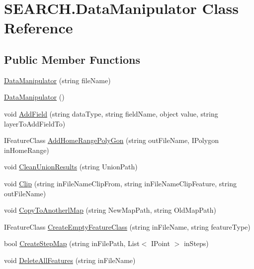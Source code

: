 \hypertarget{class_s_e_a_r_c_h_1_1_data_manipulator}{\section{S\-E\-A\-R\-C\-H.\-Data\-Manipulator Class Reference}
\label{class_s_e_a_r_c_h_1_1_data_manipulator}
}
\subsection*{Public Member Functions}
\begin{DoxyCompactItemize}
\item 
\hyperlink{class_s_e_a_r_c_h_1_1_data_manipulator_ad272a7582d505115ef08116dee408b06}{Data\-Manipulator} (string file\-Name)
\item 
\hyperlink{class_s_e_a_r_c_h_1_1_data_manipulator_acc2804681760f312bb35d3fc3b1364d7}{Data\-Manipulator} ()
\item 
void \hyperlink{class_s_e_a_r_c_h_1_1_data_manipulator_a42ccdfd6112fd36dcca324bb6981b179}{Add\-Field} (string data\-Type, string field\-Name, object value, string layer\-To\-Add\-Field\-To)
\item 
I\-Feature\-Class \hyperlink{class_s_e_a_r_c_h_1_1_data_manipulator_a1a611050f8b2b27543719ec80084ee3b}{Add\-Home\-Range\-Poly\-Gon} (string out\-File\-Name, I\-Polygon in\-Home\-Range)
\item 
void \hyperlink{class_s_e_a_r_c_h_1_1_data_manipulator_a9b3344a155bb79f1961d9c9ef8a88173}{Clean\-Union\-Results} (string Union\-Path)
\item 
void \hyperlink{class_s_e_a_r_c_h_1_1_data_manipulator_a2dded11d12d221f882b38b0ffae0f822}{Clip} (string in\-File\-Name\-Clip\-From, string in\-File\-Name\-Clip\-Feature, string out\-File\-Name)
\item 
void \hyperlink{class_s_e_a_r_c_h_1_1_data_manipulator_aebe754b172c0541c922ab3b0fbb14d9f}{Copy\-To\-Anotherl\-Map} (string New\-Map\-Path, string Old\-Map\-Path)
\item 
I\-Feature\-Class \hyperlink{class_s_e_a_r_c_h_1_1_data_manipulator_a8f12cda59193695b74bedfb48345f677}{Create\-Empty\-Feature\-Class} (string in\-File\-Name, string feature\-Type)
\item 
bool \hyperlink{class_s_e_a_r_c_h_1_1_data_manipulator_adf7dc52cf6e35b6444455c9e4278f85f}{Create\-Step\-Map} (string in\-File\-Path, List$<$ I\-Point $>$ in\-Steps)
\item 
void \hyperlink{class_s_e_a_r_c_h_1_1_data_manipulator_aa5beef05be975078b12d25244a697cf1}{Delete\-All\-Features} (string in\-File\-Name)

\end{DoxyCompactItemize}
